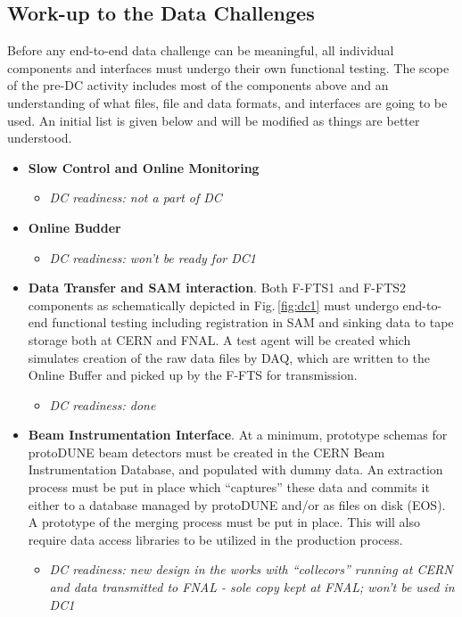 \documentclass[pdftex,12pt,letter]{article}
\newcommand{\pd}{protoDUNE\xspace}
\begin{document}
\subsection{Work-up to the Data Challenges}
Before any end-to-end data challenge can be meaningful, all individual components and interfaces must undergo
their own functional testing. The scope of the pre-DC activity includes most of the components above and an
understanding of what files, file and data formats, and interfaces are going to be used. An initial list is given below and will be modified as things are better understood.
\begin{itemize}

\item \textbf{Slow Control and Online Monitoring}
\begin{itemize}
\item \emph{DC readiness: not a part of DC}
\end{itemize}

\item \textbf{Online Budder }
\begin{itemize}
\item \emph{DC readiness: won't be ready for DC1}
\end{itemize}

\item \textbf{Data Transfer and SAM interaction}.  Both F-FTS1 and F-FTS2 components as schematically depicted in Fig.\,\ref{fig:dc1}
must undergo end-to-end functional testing including registration in SAM and sinking data to tape storage both at CERN and FNAL. A test
agent will be created which simulates creation of the raw data files by DAQ, which are written to the Online Buffer and picked up
by the F-FTS for transmission.
\begin{itemize}
\item \emph{DC readiness: done}
\end{itemize}

\item \textbf{Beam Instrumentation Interface}. At a minimum, prototype schemas for \pd beam detectors must be created in
the CERN Beam Instrumentation Database, and populated with dummy data. An extraction process must be put in place which
``captures'' these data and commits it either to a database managed by \pd and/or as files on disk (EOS). A prototype
of the merging process must be put in place. This will also require data access libraries to be utilized in the production process.
\begin{itemize}
\item \emph{DC readiness: new design in the works with ``collecors'' running at CERN and data transmitted to FNAL - sole copy kept at FNAL; won't be used in DC1}
\end{itemize}


\end{itemize}
\end{document}
